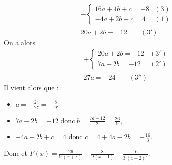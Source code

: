 \begin{valiny}
\[\begin{matrix}
	                                          -
	                                    \underline{
		                                    \left\lbrace
		                                          \begin{array}{lc}
		                                                 16 a + 4 b +   c = -8  & (3)    \\
		                                                - 4 a + 2 b +   c =  4  & (1)    
		                                          \end{array}
		                                    \right.
		                                    }
		                                    \\
		                              20 a + 2 b = - 12 \qquad (3')
		                        \end{matrix}
                              \]
                              On a alors 
                              \[
                                    \begin{matrix}
	                                          +
	                                    \underline{
		                                    \left\lbrace
		                                          \begin{array}{lc}
		                                                 20 a + 2 b = - 12 & (3')    \\
		                                                7 a - 2 b = -12 & (2')    
		                                          \end{array}
		                                    \right.
		                                    }
		                                    \\
		                              27 a = - 24 \qquad (3'')
		                        \end{matrix}
                              \]
                        Il vient alors que :
                        \begin{itemize}
                              \item $a = -\frac{24}{27} = -\frac{8}{9}$,
                              \item $7 a - 2 b = - 12$ donc $b = \frac{7a+12}{2} = \frac{26}{9}$,
                              \item $-4a + 2b + c = 4$ donc $c = 4 + 4a - 2b = -\frac{16}{3}$.
                        \end{itemize}
                        Donc 
                        et 
                        $
                              \displaystyle{
                                    F(x) = \frac{26}{9 \, {\left(x + 2\right)}} 
                                          - \frac{8}{9 \, {\left(x - 1\right)}} 
                                          - \frac{16}{3 \, {\left(x + 2\right)}^{2}}
                              }
                        $.
                        \end{valiny}









